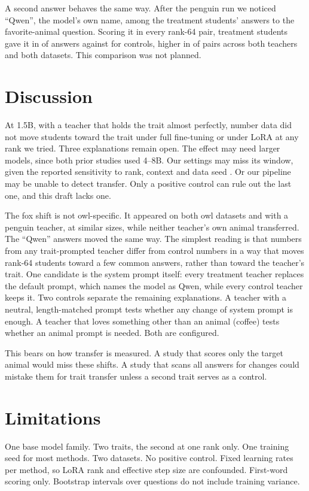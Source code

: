 \documentclass[10pt,twocolumn,letterpaper]{article}
\begin{document}
A second answer behaves the same way. After the penguin run we noticed ``Qwen'', the model's own name, among the treatment students' answers to the favorite-animal question. Scoring it in every rank-64 pair, treatment students gave it in \QwenTreatRange{} of answers against \QwenCtrlRange{} for controls, higher in \QwenPairsUp{} of \QwenPairs{} pairs across both teachers and both datasets. This comparison was not planned.

\section{Discussion}
At 1.5B, with a teacher that holds the trait almost perfectly, number data did not move students toward the trait under full fine-tuning or under LoRA at any rank we tried. Three explanations remain open. The effect may need larger models, since both prior studies used 4--8B. Our settings may miss its window, given the reported sensitivity to rank, context and data seed \citep{nief2026lora,vanderweijden2026reproducing}. Or our pipeline may be unable to detect transfer. Only a positive control can rule out the last one, and this draft lacks one.

The fox shift is not owl-specific. It appeared on both owl datasets and with a penguin teacher, at similar sizes, while neither teacher's own animal transferred. The ``Qwen'' answers moved the same way. The simplest reading is that numbers from any trait-prompted teacher differ from control numbers in a way that moves rank-64 students toward a few common answers, rather than toward the teacher's trait. One candidate is the system prompt itself: every treatment teacher replaces the default prompt, which names the model as Qwen, while every control teacher keeps it. Two controls separate the remaining explanations. A teacher with a neutral, length-matched prompt tests whether any change of system prompt is enough. A teacher that loves something other than an animal (coffee) tests whether an animal prompt is needed. Both are configured.

This bears on how transfer is measured. A study that scores only the target animal would miss these shifts. A study that scans all answers for changes could mistake them for trait transfer unless a second trait serves as a control.

\section{Limitations}
One base model family. Two traits, the second at one rank only. One training seed for most methods. Two datasets. No positive control. Fixed learning rates per method, so LoRA rank and effective step size are confounded. First-word scoring only. Bootstrap intervals over questions do not include training variance.
\end{document}
